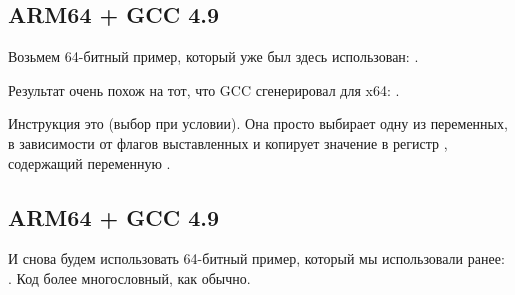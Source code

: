 \subsection{ARM64 + \Optimizing GCC 4.9}

Возьмем 64-битный пример, который уже был здесь использован: .


Результат очень похож на тот, что GCC сгенерировал для x64: .

Инструкция \CSEL это  (выбор при условии). 
Она просто выбирает одну из переменных, в зависимости от флагов выставленных \TST и копирует значение в регистр , содержащий переменную .

\subsection{ARM64 + \NonOptimizing GCC 4.9}

И снова будем использовать 64-битный пример, который мы использовали ранее: .
Код более многословный, как обычно.



